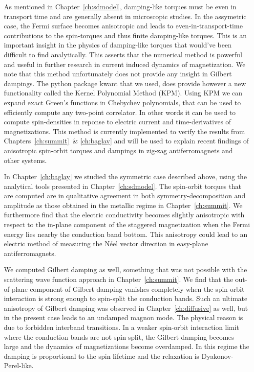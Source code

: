 As mentioned in Chapter~\ref{ch:sdmodel}, damping-like torques must be even in transport time and are generally absent in microscopic studies. In the assymetric case, the Fermi surface becomes anisotropic and leads to even-in-transport-time contributions to the spin-torques and thus finite damping-like torques. This is an important insight in the physics of damping-like torques that would've been difficult to find analytically. This asserts that the numerical method is powerful and useful in further research in current induced dynamics of magnetization. We note that this method unfortunately does not provide any insight in Gilbert dampings. The python package kwant that we used, does provide however a new functionality called the Kernel Polynomial Method (KPM). Using KPM we can expand exact Green's functions in Chebychev polynomials, that can be used to efficiently compute any two-point correlator. In other words it can be used to compute spin-densities in reponse to electric current and time-derivatives of magnetizations. This method is currently implemented to verify the results from Chapters~\ref{ch:summit}\ & \ref{ch:baglay} and will be used to explain recent findings of anisotropic spin-orbit torques and dampings in zig-zag antiferromagnets and other systems.

In Chapter~\ref{ch:baglay} we studied the symmetric case described above, using the analytical tools presented in Chapter~\ref{ch:sdmodel}. The spin-orbit torques that are computed are in qualitative agreement in both symmetry-decomposition and amplitude as those obtained in the metallic regime in Chapter~\ref{ch:summit}. We furthermore find that the electric conductivity becomes slightly anisotropic with respect to the in-plane component of the staggered magnetization when the Fermi energy lies nearby the conduction band bottom. This anisotropy could lead to an electric method of measuring the N\'eel vector direction in easy-plane antiferromagnets. 

We computed Gilbert damping as well, something that was not possible with the scattering wave function approach in Chapter~\ref{ch:summit}. We find that the out-of-plane component of Gilbert damping vanishes completely when the spin-orbit interaction is strong enough to spin-split the conduction bands. Such an ultimate anisotropy of Gilbert damping was observed in Chapter~\ref{ch:diffusive} as well, but in the present case leads to an undamped magnon mode. The physical reason is due to forbidden interband transitions. In a weaker spin-orbit interaction limit where the conduction bands are not spin-split, the Gilbert damping becomes large and the dynamics of magnetizations become overdamped. In this regime the damping is proportional to the spin lifetime and the relaxation is Dyakonov-Perel-like. 

